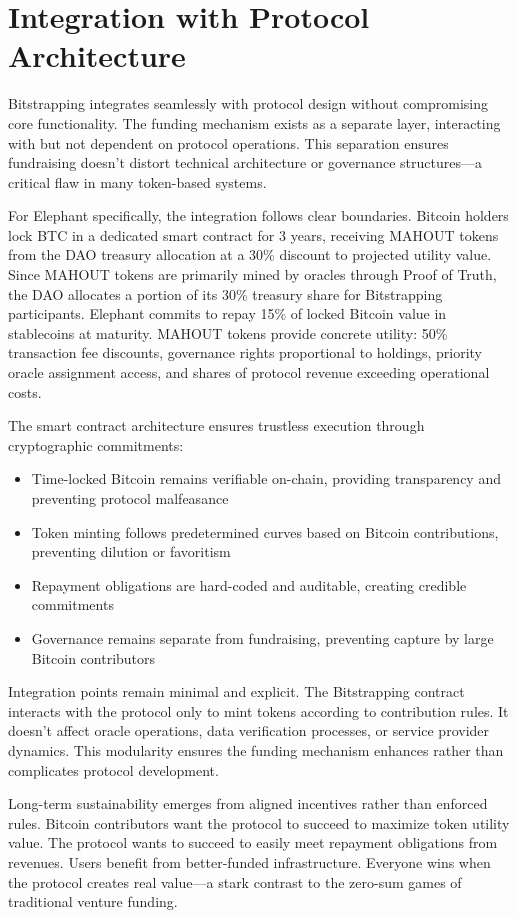 \section{Integration with Protocol Architecture}

Bitstrapping integrates seamlessly with protocol design without compromising core functionality. The funding mechanism exists as a separate layer, interacting with but not dependent on protocol operations. This separation ensures fundraising doesn't distort technical architecture or governance structures—a critical flaw in many token-based systems.

For Elephant specifically, the integration follows clear boundaries. Bitcoin holders lock BTC in a dedicated smart contract for 3 years, receiving MAHOUT tokens from the DAO treasury allocation at a 30\% discount to projected utility value. Since MAHOUT tokens are primarily mined by oracles through Proof of Truth, the DAO allocates a portion of its 30\% treasury share for Bitstrapping participants. Elephant commits to repay 15\% of locked Bitcoin value in stablecoins at maturity. MAHOUT tokens provide concrete utility: 50\% transaction fee discounts, governance rights proportional to holdings, priority oracle assignment access, and shares of protocol revenue exceeding operational costs.

The smart contract architecture ensures trustless execution through cryptographic commitments:

\begin{itemize}
\item Time-locked Bitcoin remains verifiable on-chain, providing transparency and preventing protocol malfeasance
\item Token minting follows predetermined curves based on Bitcoin contributions, preventing dilution or favoritism
\item Repayment obligations are hard-coded and auditable, creating credible commitments
\item Governance remains separate from fundraising, preventing capture by large Bitcoin contributors
\end{itemize}

Integration points remain minimal and explicit. The Bitstrapping contract interacts with the protocol only to mint tokens according to contribution rules. It doesn't affect oracle operations, data verification processes, or service provider dynamics. This modularity ensures the funding mechanism enhances rather than complicates protocol development.

Long-term sustainability emerges from aligned incentives rather than enforced rules. Bitcoin contributors want the protocol to succeed to maximize token utility value. The protocol wants to succeed to easily meet repayment obligations from revenues. Users benefit from better-funded infrastructure. Everyone wins when the protocol creates real value—a stark contrast to the zero-sum games of traditional venture funding.

